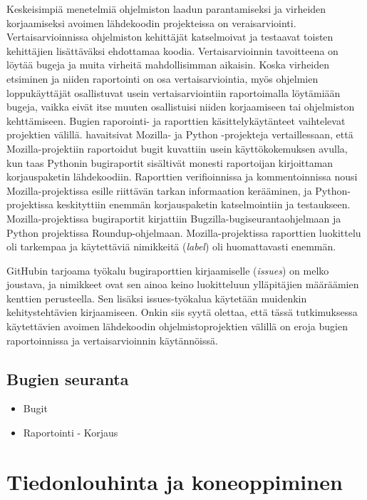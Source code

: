 \documentclass[utf8]{gradu3}
\begin{document}
Keskeisimpiä menetelmiä ohjelmiston laadun parantamiseksi ja virheiden
korjaamiseksi avoimen lähdekoodin projekteissa on veraisarviointi.
Vertaisarvioinnissa ohjelmiston kehittäjät katselmoivat ja testaavat toisten
kehittäjien lisättäväksi ehdottamaa koodia. Vertaisarvioinnin tavoitteena on
löytää bugeja ja muita virheitä mahdollisimman aikaisin. Koska virheiden
etsiminen ja niiden raportointi on osa vertaisarviointia, myös ohjelmien
loppukäyttäjät osallistuvat usein vertaisarviointiin raportoimalla löytämiään
bugeja, vaikka eivät itse muuten osallistuisi niiden korjaamiseen tai
ohjelmiston kehttämiseen. Bugien raporointi- ja raporttien käsittelykäytänteet
vaihtelevat projektien välillä. \textcite{Wang-2015} havaitsivat Mozilla- ja
Python -projekteja vertaillessaan, että Mozilla-projektiin raportoidut bugit
kuvattiin usein käyttökokemuksen avulla, kun taas Pythonin bugiraportit
sisältivät monesti raportoijan kirjoittaman korjauspaketin lähdekoodiin.
Raporttien verifioinnissa ja kommentoinnissa nousi Mozilla-projektissa esille
riittävän tarkan informaation kerääminen, ja Python-projektissa keskityttiin
enemmän korjauspaketin katselmointiin ja testaukseen. Mozilla-projektissa
bugiraportit kirjattiin Bugzilla-bugiseurantaohjelmaan ja Python projektissa
Roundup-ohjelmaan. Mozilla-projektissa raporttien luokittelu oli tarkempaa ja
käytettäviä nimikkeitä (\textit{label}) oli huomattavasti enemmän.
\parencite{Wang-2015} 

GitHubin tarjoama työkalu bugiraporttien kirjaamiselle (\textit{issues}) on
melko joustava, ja nimikkeet ovat sen ainoa keino luokitteluun ylläpitäjien
määräämien kenttien perusteella. Sen lisäksi issues-työkalua käytetään muidenkin
kehitystehtävien kirjaamiseen.  Onkin siis syytä olettaa, että tässä
tutkimuksessa käytettävien avoimen lähdekoodin ohjelmistoprojektien välillä on
eroja bugien raportoinnissa ja vertaisarvioinnin käytännöissä.

\section{Bugien seuranta}
\begin{itemize}
  \item Bugit
  \item Raportointi - Korjaus
\end{itemize}
  
\chapter{Tiedonlouhinta ja koneoppiminen}
\end{document}
